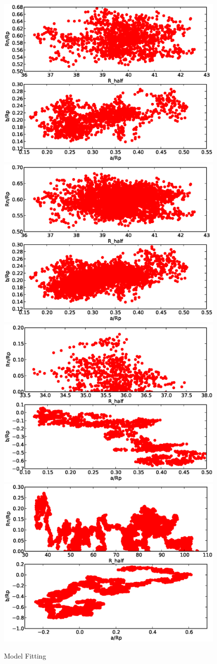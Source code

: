 \begin{figure}
  \includegraphics[width=0.5\hsize]{plots/Crescent.eps}
  \includegraphics[width=0.5\hsize]{plots/CrescentReverse.eps}\\
  \includegraphics[width=0.5\hsize]{plots/Disk.eps}
  \includegraphics[width=0.5\hsize]{plots/Gauss.eps}
\caption{Model Fitting}
\end{figure}


